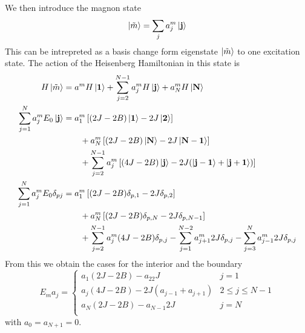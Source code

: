 \documentclass[../../../main.tex]{subfiles}
\begin{document}
We then introduce the magnon state
\begin{equation*}
    \ket{\tilde{m}  } =
    \sum_{j } a_j ^{m }\ket{\mathbf{j}}
\end{equation*}
This can be intrepreted as a basis change form eigenstate $\ket{\tilde{m}}$ to one excitation state.
The action of the Heisenberg Hamiltonian in this state is
\begin{align*}
    H \ket{\tilde{m}  }                        & =
    a ^{m} H \ket{\mathbf{1}} + \sum_{j=2 }^{N-1} a_j ^{m } H\ket{\mathbf{j}} + a_N ^{m} H \ket{\mathbf{N}}                                                                                              \\
    \sum_{j=1} ^{N} a_j^m E_0 \ket{\mathbf{j}} & = a_1 ^{m} \left[ (2J-2B) \ket{\mathbf{1}} - 2J \ket{\mathbf{2}}   \right]                                                                              \\
                                               & \qquad + a_N ^{m} \left[ (2J-2B) \ket{\mathbf{N}} - 2J \ket{\mathbf{N-1}}\right]                                                                        \\
                                               & \qquad + \sum_{j=2 } ^{N-1} a_j ^{m} \left[  (4J-2B) \ket{\mathbf{j}} - 2J ( \ket{\mathbf{j-1}} + \ket{\mathbf{j+1}}) \right]                           \\
    \sum_{j=1} ^{N} a_j^m E_0 \delta_{pj}      & = a_1 ^{m} \left[ (2J-2B) \delta_{p,1} - 2J \delta_{p,2}\right]                                                                                         \\
                                               & \qquad + a_N ^{m} \left[ (2J-2B) \delta_{p,N} - 2J \delta_{p,N-1 }\right]                                                                               \\
                                               & \qquad + \sum_{j=2 } ^{N-1} a_j ^{m} (4J-2B) \delta_{p,j} - \sum_{j=1 } ^{N-2}a_{j+1} ^{m}2J \delta_{p,j} - \sum_{j=3 } ^{N}a_{j-1} ^{m}2J \delta_{p,j}
\end{align*}
From this we obtain the cases for the interior and the boundary
\begin{equation*}
    E_m a_j =
    \begin{cases}
        a_1(2J-2B) - a_22J             & j = 1             \\
        a_j(4J-2B)-2J(a_{j-1}+a_{j+1}) & 2 \leq j \leq N-1 \\
        a_N(2J-2B) - a_{N-1}2J         & j = N             \\
    \end{cases}
\end{equation*}
with $a_0 = a_{N+1} = 0$.
\end{document}
